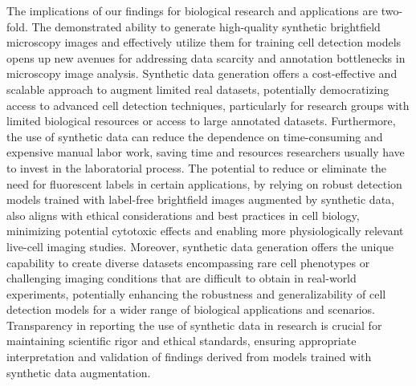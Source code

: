 The implications of our findings for biological research and applications are two-fold.
The demonstrated ability to generate high-quality synthetic brightfield microscopy images and effectively utilize them for training cell detection  models opens up new avenues for addressing data scarcity and annotation bottlenecks in microscopy image analysis.
Synthetic data generation offers a cost-effective and scalable approach to augment limited real datasets, potentially democratizing access to advanced cell detection techniques, particularly for research groups with limited biological resources or access to large annotated datasets.
Furthermore, the use of synthetic data can reduce the dependence on time-consuming and expensive manual labor work, saving time and resources researchers usually have to invest in the laboratorial process.
The potential to reduce or eliminate the need for fluorescent labels in certain applications, by relying on robust detection models trained with label-free brightfield images augmented by synthetic data, also aligns with ethical considerations and best practices in cell biology, minimizing potential cytotoxic effects and enabling more physiologically relevant live-cell imaging studies.
Moreover, synthetic data generation offers the unique capability to create diverse datasets encompassing rare cell phenotypes or challenging imaging conditions that are difficult to obtain in real-world experiments, potentially enhancing the robustness and generalizability of cell detection models for a wider range of biological applications and scenarios.
Transparency in reporting the use of synthetic data in research is crucial for maintaining scientific rigor and ethical standards, ensuring appropriate interpretation and validation of findings derived from models trained with synthetic data augmentation.